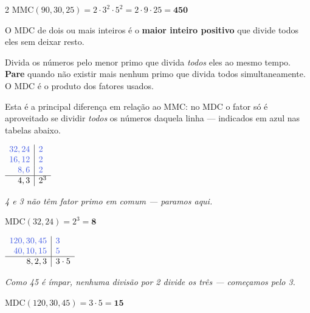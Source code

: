 \documentclass[12pt]{article}
\begin{document}
\begin{multicols}{2}
\vspace{0.3cm}
MMC$(90, 30, 25) = 2 \cdot 3^2 \cdot 5^2 = 2 \cdot 9 \cdot 25 = \textbf{450}$


O MDC de dois ou mais inteiros é o \textbf{maior inteiro positivo} que divide todos eles sem deixar resto.


Divida os números pelo menor primo que divida \textit{todos} eles ao mesmo tempo. \textbf{Pare} quando não existir mais nenhum primo que divida todos simultaneamente. O MDC é o produto dos fatores usados.

Esta é a principal diferença em relação ao MMC: no MDC o fator só é aproveitado se dividir \textit{todos} os números daquela linha — indicados em \textcolor{iris}{azul} nas tabelas abaixo.


$\begin{array}{r|l}
\textcolor{iris}{32,24} & \textcolor{iris}{2} \\
\textcolor{iris}{16,12} & \textcolor{iris}{2} \\
\textcolor{iris}{8,6}   & \textcolor{iris}{2} \\
\hline
4,3 & 2^3
\end{array}$

\vspace{0.2cm}
{\small\textit{4 e 3 não têm fator primo em comum — paramos aqui.}}

\vspace{0.3cm}
MDC$(32, 24) = 2^3 = \textbf{8}$


$\begin{array}{r|l}
\textcolor{iris}{120,30,45} & \textcolor{iris}{3} \\
\textcolor{iris}{40,10,15}  & \textcolor{iris}{5} \\
\hline
8,2,3 & 3 \cdot 5
\end{array}$

\vspace{0.2cm}
{\small\textit{Como 45 é ímpar, nenhuma divisão por 2 divide os três — começamos pelo 3.}}

\vspace{0.3cm}
MDC$(120, 30, 45) = 3 \cdot 5 = \textbf{15}$



\end{multicols}
\end{document}
